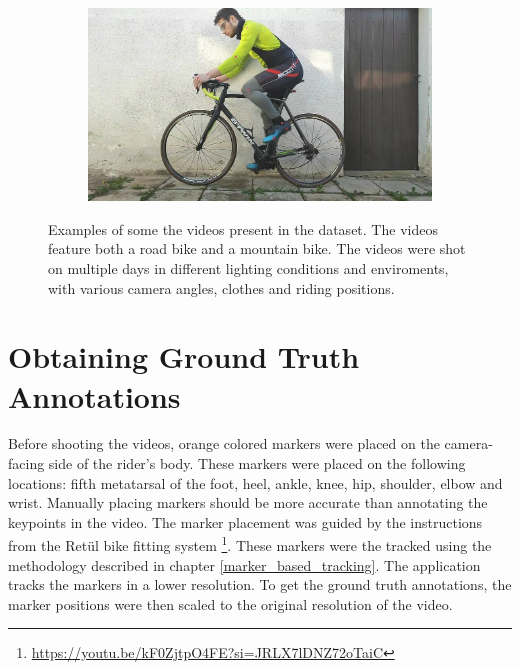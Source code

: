 \begin{figure}[htbp]
\begin{subfigure}[b]{\imgwidth}
    \end{subfigure}
    \hfill
    \begin{subfigure}[b]{\imgwidth}
        \centering

        \includegraphics[width=1\linewidth]{obrazky-figures/9.png}
    \end{subfigure}


    \caption{Examples of some the videos present in the dataset. The videos feature both a road bike and a mountain bike. The videos were shot on multiple days in different lighting conditions and enviroments, with various camera angles, clothes and riding positions.}
    \label{fig:examples}
\end{figure}




\section{Obtaining Ground Truth Annotations}
Before shooting the videos, orange colored markers were placed on the camera-facing side of the rider's body. These markers were placed on the following locations: fifth metatarsal of the foot, heel, ankle, knee, hip, shoulder, elbow and wrist. Manually placing markers should be more accurate than annotating the keypoints in the video. The marker placement was guided by the instructions from the Retül bike fitting system \footnote{\url{https://youtu.be/kF0ZjtpO4FE?si=JRLX7lDNZ72oTaiC}}. These markers were the tracked using the methodology described in chapter \ref{marker_based_tracking}. The application tracks the markers in a lower resolution. To get the ground truth annotations, the marker positions were then scaled to the original resolution of the video.

